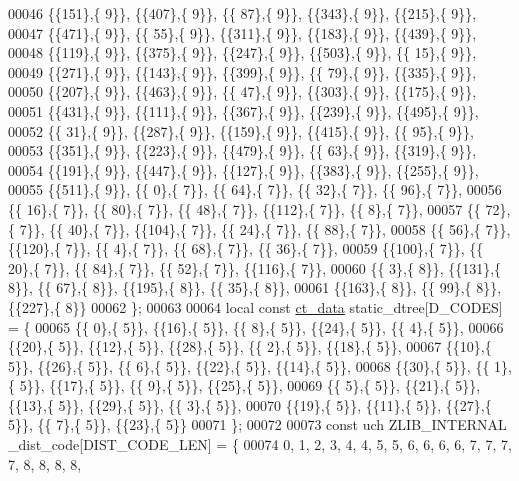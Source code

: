 \begin{DoxyCode}
00046 \{\{151\},\{  9\}\}, \{\{407\},\{  9\}\}, \{\{ 87\},\{  9\}\}, \{\{343\},\{  9\}\}, \{\{215\},\{  9\}\},
00047 \{\{471\},\{  9\}\}, \{\{ 55\},\{  9\}\}, \{\{311\},\{  9\}\}, \{\{183\},\{  9\}\}, \{\{439\},\{  9\}\},
00048 \{\{119\},\{  9\}\}, \{\{375\},\{  9\}\}, \{\{247\},\{  9\}\}, \{\{503\},\{  9\}\}, \{\{ 15\},\{  9\}\},
00049 \{\{271\},\{  9\}\}, \{\{143\},\{  9\}\}, \{\{399\},\{  9\}\}, \{\{ 79\},\{  9\}\}, \{\{335\},\{  9\}\},
00050 \{\{207\},\{  9\}\}, \{\{463\},\{  9\}\}, \{\{ 47\},\{  9\}\}, \{\{303\},\{  9\}\}, \{\{175\},\{  9\}\},
00051 \{\{431\},\{  9\}\}, \{\{111\},\{  9\}\}, \{\{367\},\{  9\}\}, \{\{239\},\{  9\}\}, \{\{495\},\{  9\}\},
00052 \{\{ 31\},\{  9\}\}, \{\{287\},\{  9\}\}, \{\{159\},\{  9\}\}, \{\{415\},\{  9\}\}, \{\{ 95\},\{  9\}\},
00053 \{\{351\},\{  9\}\}, \{\{223\},\{  9\}\}, \{\{479\},\{  9\}\}, \{\{ 63\},\{  9\}\}, \{\{319\},\{  9\}\},
00054 \{\{191\},\{  9\}\}, \{\{447\},\{  9\}\}, \{\{127\},\{  9\}\}, \{\{383\},\{  9\}\}, \{\{255\},\{  9\}\},
00055 \{\{511\},\{  9\}\}, \{\{  0\},\{  7\}\}, \{\{ 64\},\{  7\}\}, \{\{ 32\},\{  7\}\}, \{\{ 96\},\{  7\}\},
00056 \{\{ 16\},\{  7\}\}, \{\{ 80\},\{  7\}\}, \{\{ 48\},\{  7\}\}, \{\{112\},\{  7\}\}, \{\{  8\},\{  7\}\},
00057 \{\{ 72\},\{  7\}\}, \{\{ 40\},\{  7\}\}, \{\{104\},\{  7\}\}, \{\{ 24\},\{  7\}\}, \{\{ 88\},\{  7\}\},
00058 \{\{ 56\},\{  7\}\}, \{\{120\},\{  7\}\}, \{\{  4\},\{  7\}\}, \{\{ 68\},\{  7\}\}, \{\{ 36\},\{  7\}\},
00059 \{\{100\},\{  7\}\}, \{\{ 20\},\{  7\}\}, \{\{ 84\},\{  7\}\}, \{\{ 52\},\{  7\}\}, \{\{116\},\{  7\}\},
00060 \{\{  3\},\{  8\}\}, \{\{131\},\{  8\}\}, \{\{ 67\},\{  8\}\}, \{\{195\},\{  8\}\}, \{\{ 35\},\{  8\}\},
00061 \{\{163\},\{  8\}\}, \{\{ 99\},\{  8\}\}, \{\{227\},\{  8\}\}
00062 \};
00063 
00064 local \textcolor{keyword}{const} \hyperlink{structct__data__s}{ct\_data} static\_dtree[D\_CODES] = \{
00065 \{\{ 0\},\{ 5\}\}, \{\{16\},\{ 5\}\}, \{\{ 8\},\{ 5\}\}, \{\{24\},\{ 5\}\}, \{\{ 4\},\{ 5\}\},
00066 \{\{20\},\{ 5\}\}, \{\{12\},\{ 5\}\}, \{\{28\},\{ 5\}\}, \{\{ 2\},\{ 5\}\}, \{\{18\},\{ 5\}\},
00067 \{\{10\},\{ 5\}\}, \{\{26\},\{ 5\}\}, \{\{ 6\},\{ 5\}\}, \{\{22\},\{ 5\}\}, \{\{14\},\{ 5\}\},
00068 \{\{30\},\{ 5\}\}, \{\{ 1\},\{ 5\}\}, \{\{17\},\{ 5\}\}, \{\{ 9\},\{ 5\}\}, \{\{25\},\{ 5\}\},
00069 \{\{ 5\},\{ 5\}\}, \{\{21\},\{ 5\}\}, \{\{13\},\{ 5\}\}, \{\{29\},\{ 5\}\}, \{\{ 3\},\{ 5\}\},
00070 \{\{19\},\{ 5\}\}, \{\{11\},\{ 5\}\}, \{\{27\},\{ 5\}\}, \{\{ 7\},\{ 5\}\}, \{\{23\},\{ 5\}\}
00071 \};
00072 
00073 \textcolor{keyword}{const} uch ZLIB\_INTERNAL \_dist\_code[DIST\_CODE\_LEN] = \{
00074  0,  1,  2,  3,  4,  4,  5,  5,  6,  6,  6,  6,  7,  7,  7,  7,  8,  8,  8,  8,

\end{DoxyCode}
